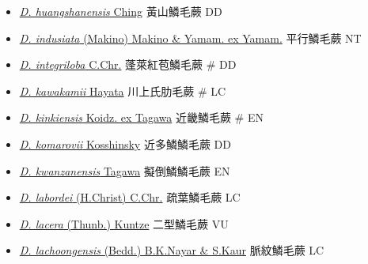 \begin{itemize}
\begin{itemize}
        \item[] \href{http://www.theplantlist.org/tpl1.1/search?q=Dryopteris+huangshanensis}{\textit{D. huangshanensis} Ching}   黃山鱗毛蕨   DD
        \item[] \href{http://www.theplantlist.org/tpl1.1/search?q=Dryopteris+indusiata}{\textit{D. indusiata} (Makino) Makino \& Yamam. ex Yamam.}   平行鱗毛蕨   NT
        \item[] \href{http://www.theplantlist.org/tpl1.1/search?q=Dryopteris+integriloba}{\textit{D. integriloba} C.Chr.}   蓬萊紅苞鱗毛蕨  \# DD
        \item[] \href{http://www.theplantlist.org/tpl1.1/search?q=Dryopteris+kawakamii}{\textit{D. kawakamii} Hayata}   川上氏肋毛蕨  \# LC
        \item[] \href{http://www.theplantlist.org/tpl1.1/search?q=Dryopteris+kinkiensis}{\textit{D. kinkiensis} Koidz. ex Tagawa}   近畿鱗毛蕨  \# EN
        \item[] \href{http://www.theplantlist.org/tpl1.1/search?q=Dryopteris+komarovii}{\textit{D. komarovii} Kosshinsky}   近多鱗鱗毛蕨   DD
        \item[] \href{http://www.theplantlist.org/tpl1.1/search?q=Dryopteris+kwanzanensis}{\textit{D. kwanzanensis} Tagawa}   擬倒鱗鱗毛蕨   EN
        \item[] \href{http://www.theplantlist.org/tpl1.1/search?q=Dryopteris+labordei}{\textit{D. labordei} (H.Christ) C.Chr.}   疏葉鱗毛蕨   LC
        \item[] \href{http://www.theplantlist.org/tpl1.1/search?q=Dryopteris+lacera}{\textit{D. lacera} (Thunb.) Kuntze}   二型鱗毛蕨   VU
        \item[] \href{http://www.theplantlist.org/tpl1.1/search?q=Dryopteris+lachoongensis}{\textit{D. lachoongensis} (Bedd.) B.K.Nayar \& S.Kaur}   脈紋鱗毛蕨   LC

\end{itemize}
\end{itemize}
